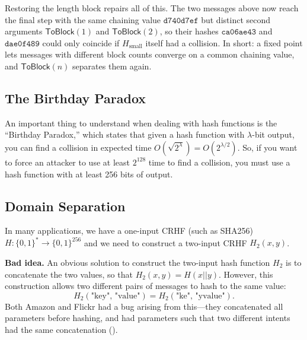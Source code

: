 \documentclass[
  letterpaper,
]{scrbook}
\newcommand{\zo}{\{0,1\}}
\newcommand{\bin}{\zo}
\theoremstyle{definition}
\theoremstyle{plain}
\theoremstyle{plain}
\theoremstyle{remark}
\begin{document}
Restoring the length block repairs all of this. The two messages above
now reach the final step with the same chaining value
\(\texttt{d740d7ef}\) but distinct second arguments
\(\mathsf{ToBlock}(1)\) and \(\mathsf{ToBlock}(2)\), so their hashes
\(\texttt{ca06ae43}\) and \(\texttt{dae0f489}\) could only coincide if
\(H_\text{small}\) itself had a collision. In short: a fixed point lets
messages with different block counts converge on a common chaining
value, and \(\mathsf{ToBlock}(n)\) separates them again.

\subsection{The Birthday Paradox}\label{the-birthday-paradox}


An important thing to understand when dealing with hash functions is the
``Birthday Paradox,'' which states that given a hash function with
\(\lambda\)-bit output, you can find a collision in expected time
\(O(\sqrt{2^\lambda}) = O(2^{\lambda/2})\). So, if you want to force an
attacker to use at least \(2^{128}\) time to find a collision, you must
use a hash function with at least 256 bits of output.

\subsection{Domain Separation}\label{domain-separation}

In many applications, we have a one-input CRHF (such as SHA256)
\(H: \bin^* \rightarrow \bin^{256}\) and we need to construct a
two-input CRHF \(H_2(x, y)\).

\textbf{Bad idea.} An obvious solution to construct the two-input hash
function \(H_2\) is to concatenate the two values, so that
\(H_2(x, y) = H(x || y)\). However, this construction allows two
different pairs of messages to hash to the same value:
\[H_2(\text{"key", "value"}) = H_2(\text{"ke", "yvalue"}).\] Both Amazon
and Flickr had a bug arising from this---they concatenated all
parameters before hashing, and had parameters such that two different
intents had the same concatenation ().
\end{document}
